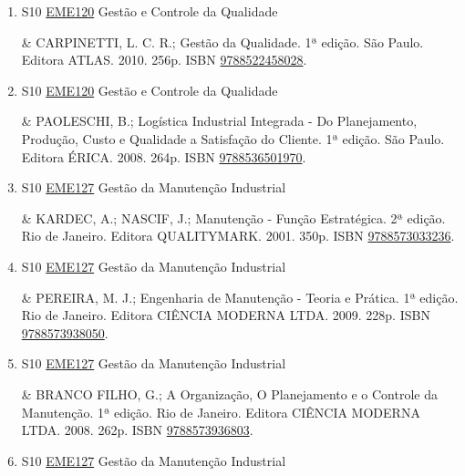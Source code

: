 \documentclass[12pt,a4paper]{book}
\begin{document}
\begin{enumerate}
 \item S10 \hyperref[PUD:EME120]{EME120} Gestão e Controle da Qualidade

&  CARPINETTI, L.  C.  R.;  Gestão da Qualidade.  1ª edição.  São Paulo.  Editora ATLAS.  2010.  256p.  ISBN \href{http://www.bn.br/site/pages/servicosProfissionais/agenciaISBN/isbnBusca/FbnBuscaISBNCatalogo.asp?pField=ISBN&pIntPagina=1&pISBN=22458028&nidbISBN=true&hidbISBN=true}{9788522458028}. 
 

 \item S10 \hyperref[PUD:EME120]{EME120} Gestão e Controle da Qualidade

&  PAOLESCHI, B.;  Logística Industrial Integrada - Do Planejamento, Produção, Custo e Qualidade a Satisfação do Cliente.  1ª edição.  São Paulo.  Editora ÉRICA.  2008.  264p.  ISBN \href{http://www.bn.br/site/pages/servicosProfissionais/agenciaISBN/isbnBusca/FbnBuscaISBNCatalogo.asp?pField=ISBN&pIntPagina=1&pISBN=36501970&nidbISBN=true&hidbISBN=true}{9788536501970}.
 \item S10 \hyperref[PUD:EME127]{EME127} Gestão da Manutenção Industrial

& KARDEC, A.;  NASCIF, J.;  Manutenção - Função Estratégica.  2ª edição.  Rio de Janeiro.  Editora QUALITYMARK.  2001.  350p.  ISBN \href{http://www.bn.br/site/pages/servicosProfissionais/agenciaISBN/isbnBusca/FbnBuscaISBNCatalogo.asp?pField=ISBN&pIntPagina=1&pISBN=73033236&nidbISBN=true&hidbISBN=true}{9788573033236}. 
 

 \item S10 \hyperref[PUD:EME127]{EME127} Gestão da Manutenção Industrial

& PEREIRA, M.  J.;  Engenharia de Manutenção - Teoria e Prática.  1ª edição.  Rio de Janeiro.  Editora CIÊNCIA MODERNA LTDA.  2009.  228p.  ISBN \href{http://www.bn.br/site/pages/servicosProfissionais/agenciaISBN/isbnBusca/FbnBuscaISBNCatalogo.asp?pField=ISBN&pIntPagina=1&pISBN=73938050&nidbISBN=true&hidbISBN=true}{9788573938050}. 
 

 \item S10 \hyperref[PUD:EME127]{EME127} Gestão da Manutenção Industrial

& BRANCO FILHO, G.;  A Organização, O Planejamento e o Controle da Manutenção.  1ª edição.  Rio de Janeiro.  Editora CIÊNCIA MODERNA LTDA.  2008.  262p.  ISBN \href{http://www.bn.br/site/pages/servicosProfissionais/agenciaISBN/isbnBusca/FbnBuscaISBNCatalogo.asp?pField=ISBN&pIntPagina=1&pISBN=73936803&nidbISBN=true&hidbISBN=true}{9788573936803}.
 \item S10 \hyperref[PUD:EME127]{EME127} Gestão da Manutenção Industrial


\end{enumerate}
\end{document}
